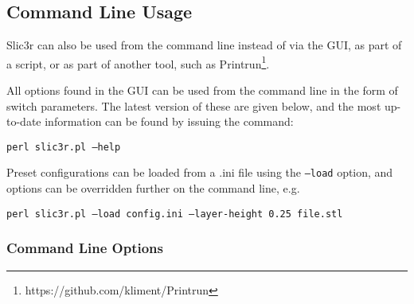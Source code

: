 
\subsection{Command Line Usage} %
\label{sec:command_line_usage}

Slic3r can also be used from the command line instead of via the GUI, as part of a script, or as part of another tool, such as Printrun\footnote{https://github.com/kliment/Printrun}.

All options found in the GUI can be used from the command line in the form of switch parameters.  The latest version of these are given below, and the most up-to-date information can be found by issuing the command: \par\texttt{perl slic3r.pl --help}

Preset configurations can be loaded from a .ini file using the \texttt{--load} option, and options can be overridden further on the command line, e.g. \par\texttt{perl slic3r.pl --load config.ini --layer-height 0.25 file.stl}

\subsubsection{Command Line Options} %
\label{sub:command_line_options}

